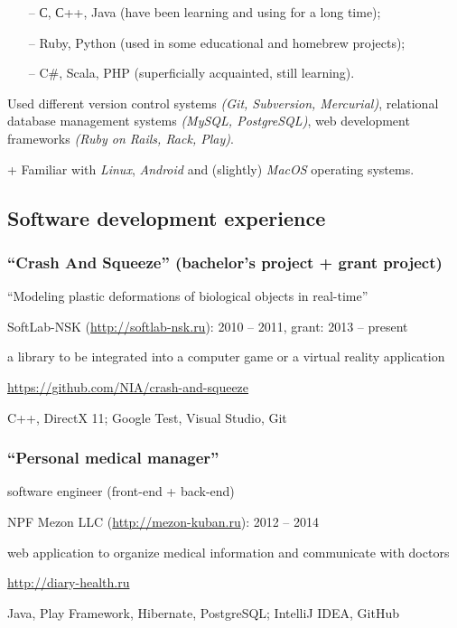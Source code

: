 \documentclass[a4paper, 12pt]{article}
\begin{document}
  \begin{itemize}[itemsep=1.5mm,topsep=2mm]
    \item[--] С, С++, Java (have been learning and using for a long time);
    \item[--] Ruby, Python (used in some educational and homebrew projects);
    \item[--] C\#, Scala, PHP (superficially acquainted, still learning).
  \end{itemize}

  Used different version control systems \emph{(Git, Subversion, Mercurial)}, relational database
  management systems \emph{(MySQL, PostgreSQL)}, web development frameworks \emph{(Ruby on Rails, Rack, Play)}.

  + Familiar with \emph{Linux}, \emph{Android} and (slightly) \emph{MacOS} operating systems.

  \subsection*{Software development experience}

  \subsubsection*{``Crash And Squeeze'' (bachelor's project + grant project)}
  \begin{description}[labelindent=1em] %
    \item[Topic:] ``Modeling plastic deformations of biological objects in real-time''
    \item[Company:] SoftLab-NSK (\url{http://softlab-nsk.ru}): 2010 -- 2011, grant: 2013 -- present
    \item[Description:] a library to be integrated into a computer game or a virtual reality application
    \item[Source code:] \url{https://github.com/NIA/crash-and-squeeze}
    \item[Technologies and tools:] C++, DirectX 11; Google Test, Visual Studio, Git
  \end{description}


  \subsubsection*{``Personal medical manager''}
  \begin{description}[labelindent=1em]
    \item[Position:] software engineer (front-end + back-end)
    \item[Company:] NPF Mezon LLC (\url{http://mezon-kuban.ru}): 2012 -- 2014
    \item[Description:] web application to organize medical information and communicate with doctors
    \item[Website:] \url{http://diary-health.ru}
    \item[Technologies and tools:] Java, Play Framework, Hibernate, PostgreSQL; IntelliJ IDEA, GitHub
  \end{description}
\end{document}
